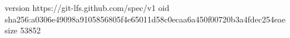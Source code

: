 version https://git-lfs.github.com/spec/v1
oid sha256:a0306e49098a9105856805f4e65011d58c0ecaa6a450f00720b3a4fdec254eae
size 53852
